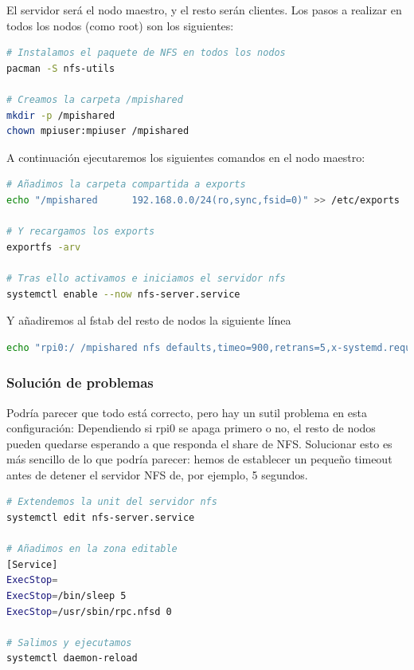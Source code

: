 El servidor será el nodo maestro, y el resto serán clientes. Los pasos a realizar en todos los nodos (como root) son los siguientes:

\begin{lstlisting}[language=bash]
# Instalamos el paquete de NFS en todos los nodos
pacman -S nfs-utils

# Creamos la carpeta /mpishared
mkdir -p /mpishared
chown mpiuser:mpiuser /mpishared
\end{lstlisting}

A continuación ejecutaremos los siguientes comandos en el nodo maestro:

\begin{lstlisting}[language=bash]
# Añadimos la carpeta compartida a exports
echo "/mpishared      192.168.0.0/24(ro,sync,fsid=0)" >> /etc/exports

# Y recargamos los exports
exportfs -arv

# Tras ello activamos e iniciamos el servidor nfs
systemctl enable --now nfs-server.service
\end{lstlisting}

Y añadiremos al fstab del resto de nodos la siguiente línea
\begin{lstlisting}[language=bash]
echo "rpi0:/ /mpishared nfs defaults,timeo=900,retrans=5,x-systemd.requires=network-online.target,_netdev 0 0" >> /etc/fstab
\end{lstlisting}

\subsubsection{Solución de problemas}
Podría parecer que todo está correcto, pero hay un sutil problema en esta configuración: Dependiendo si rpi0 se apaga primero o no, el resto de nodos pueden quedarse esperando a que responda el share de NFS. Solucionar esto es más sencillo de lo que podría parecer: hemos de establecer un pequeño timeout antes de detener el servidor NFS de, por ejemplo, 5 segundos.

\begin{lstlisting}[language=bash]
# Extendemos la unit del servidor nfs
systemctl edit nfs-server.service

# Añadimos en la zona editable
[Service]
ExecStop=
ExecStop=/bin/sleep 5
ExecStop=/usr/sbin/rpc.nfsd 0

# Salimos y ejecutamos
systemctl daemon-reload
\end{lstlisting}
